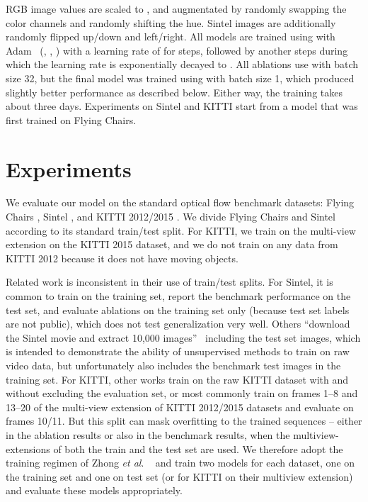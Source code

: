 \documentclass[runningheads]{llncs}
\newcommand{\etal}{\textit{et al}. }
\begin{document}
RGB image values are scaled to , and augmentated by randomly swapping the color channels and randomly shifting the hue. Sintel images are additionally randomly flipped up/down and left/right. All models are trained using with Adam~\cite{KingmaAdam} (, , ) with a learning rate of  for  steps, followed by another  steps during which the learning rate is exponentially decayed to . All ablations use  with batch size 32, but the final model was trained using  with batch size 1, which produced slightly better performance as described below. Either way, the training takes about three days. Experiments on Sintel and KITTI start from a model that was first trained on Flying Chairs.
   

\section{Experiments}
\label{sec:experiments}

We evaluate our model on the standard optical flow benchmark datasets: Flying Chairs \cite{FlowNet}, Sintel \cite{ButlerECCV2012}, and KITTI 2012/2015 \cite{Geiger2012CVPR,KITTI2015}. We divide Flying Chairs and Sintel according to its standard train/test split. For KITTI, we train on the multi-view extension on the KITTI 2015 dataset, and we do not train on any data from KITTI 2012 because it does not have moving objects.

Related work is inconsistent in their use of train/test splits. For Sintel, it is common to train on the training set, report the benchmark performance on the test set, and evaluate ablations on the training set only (because test set labels are not public), which does not test generalization very well.
Others ``download the Sintel movie and extract 10,000 images''~\cite{SelFlow} including the test set images, which is intended to demonstrate the ability of unsupervised methods to train on raw video data, but unfortunately also includes the benchmark test images in the training set.
For KITTI, other works train on the raw KITTI dataset with and without excluding the evaluation set, or most commonly train on frames 1--8 and 13--20 of the multi-view extension of KITTI 2012/2015 datasets and evaluate on frames 10/11.
But this split can mask overfitting to the trained sequences -- either in the ablation results or also in the benchmark results, when the multiview-extensions of both the train and the test set are used. We therefore adopt the training regimen of Zhong \etal~\cite{Zhong2019UnsupervisedDE} and train two models for each dataset, one on the training set and one on test set (or for KITTI on their multiview extension) and evaluate these models appropriately.
\end{document}
